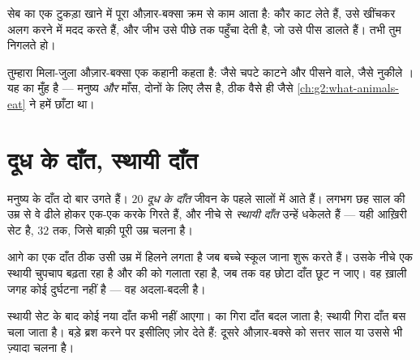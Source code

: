 \begin{example}[सेब का एक कौर, तीन औज़ार]\label{ex:g2:teeth-and-eating-well:apple}
सेब का एक टुकड़ा खाने में पूरा औज़ार-बक्सा क्रम से काम आता है: 
कौर काट लेते हैं,  उसे खींचकर अलग करने में मदद करते हैं, और जीभ
उसे पीछे  तक पहुँचा देती है, जो उसे पीस डालते हैं। तभी तुम
निगलते हो।
\end{example}

\begin{remark}[जंतुओं को याद करो]\label{rem:g2:teeth-and-eating-well:animals}
तुम्हारा मिला-जुला औज़ार-बक्सा एक कहानी कहता है:  जैसे चपटे
काटने और पीसने वाले,  जैसे नुकीले । यह  का मुँह
है --- मनुष्य  \emph{और} माँस, दोनों के लिए लैस है, ठीक वैसे ही
जैसे \cref{ch:g2:what-animals-eat} ने हमें छाँटा था।
\end{remark}

\section{दूध के दाँत, स्थायी दाँत}

\begin{proposition}[एक जीवन में दो सेट]\label{prop:g2:teeth-and-eating-well:sets}
मनुष्य के दाँत दो बार उगते हैं। $20$ \emph{दूध के दाँत}
जीवन के पहले सालों में आते हैं। लगभग छह साल की उम्र से वे ढीले
होकर एक-एक करके गिरते हैं, और नीचे से \emph{स्थायी दाँत}
उन्हें धकेलते हैं --- यही आख़िरी सेट है, $32$ तक, जिसे बाक़ी
पूरी उम्र चलना है।
\end{proposition}
\admitted

\begin{example}[हिलता कृंतक]\label{ex:g2:teeth-and-eating-well:wobbly}
आगे का एक दाँत ठीक उसी उम्र में हिलने लगता है जब बच्चे स्कूल जाना शुरू
करते हैं। उसके नीचे एक स्थायी  चुपचाप बढ़ता रहा है और 
की  को गलाता रहा है, जब तक वह छोटा दाँत छूट न जाए। वह ख़ाली जगह कोई
दुर्घटना नहीं है --- वह अदला-बदली है।
\end{example}

\begin{remark}[तीसरा सेट नहीं होता]\label{rem:g2:teeth-and-eating-well:nothird}
स्थायी सेट के बाद कोई नया दाँत कभी नहीं आएगा।  का गिरा दाँत बदल
जाता है; स्थायी गिरा दाँत बस चला जाता है। बड़े ब्रश करने पर इसीलिए
ज़ोर देते हैं: दूसरे औज़ार-बक्से को सत्तर साल या उससे भी ज़्यादा चलना
है।
\end{remark}

